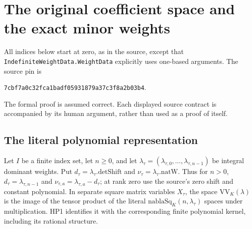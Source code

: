 \section{The original coefficient space and the exact minor weights}
\label{sec:coefficient-fock-bridge}


All indices below start at zero, as in the source, except that
\texttt{IndefiniteWeightData.WeightData} explicitly uses one-based
arguments.  The source pin is
\begin{center}
\texttt{7cbf7a0c32fca1badf05931879a37c3f8a2b03b4}.
\end{center}
The formal proof is assumed correct.  Each displayed source contract
is accompanied by its human argument, rather than used as a proof of
itself.

\subsection*{The literal polynomial representation}

Let \(I\) be a finite index set, let \(n\ge0\), and let
\(\lambda_\tau=(\lambda_{\tau,0},\ldots,
\lambda_{\tau,n-1})\) be integral dominant weights.
Put \(d_\tau=\lambda_\tau.\mathrm{detShift}\) and
\(\nu_\tau=\lambda_\tau.\mathrm{natW}\).  Thus for \(n>0\),
\(d_\tau=\lambda_{\tau,n-1}\) and
\(\nu_{\tau,a}=\lambda_{\tau,a}-d_\tau\); at rank zero use the
source's zero shift and constant polynomial.  In separate square
matrix variables \(X_\tau\), the space
\(\mathrm{VV}_K(\lambda)\) is the image of the tensor product of the
literal \(\mathrm{nablaSq}_K(n,\lambda_\tau)\) spaces under
multiplication.  HP1 identifies it with the corresponding finite
polynomial kernel, including its rational structure.

